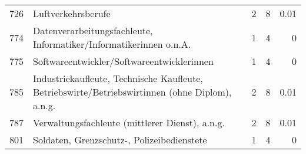 \begin{longtable}{lXrrr}
     726 &
     \multicolumn{1}{X}{ Luftverkehrsberufe   } &


       \num{2} &
       \num[round-mode=places,round-precision=2]{8} &
         \num[round-mode=places,round-precision=2]{0,01} \\

     774 &
     \multicolumn{1}{X}{ Datenverarbeitungsfachleute, Informatiker/Informatikerinnen o.n.A.   } &


       \num{1} &
       \num[round-mode=places,round-precision=2]{4} &
         \num[round-mode=places,round-precision=2]{0} \\

     775 &
     \multicolumn{1}{X}{ Softwareentwickler/Softwareentwicklerinnen   } &


       \num{1} &
       \num[round-mode=places,round-precision=2]{4} &
         \num[round-mode=places,round-precision=2]{0} \\

     785 &
     \multicolumn{1}{X}{ Industriekaufleute, Technische Kaufleute, Betriebswirte/Betriebswirtinnen (ohne Diplom), a.n.g.   } &


       \num{2} &
       \num[round-mode=places,round-precision=2]{8} &
         \num[round-mode=places,round-precision=2]{0,01} \\

     787 &
     \multicolumn{1}{X}{ Verwaltungsfachleute (mittlerer Dienst), a.n.g.   } &


       \num{2} &
       \num[round-mode=places,round-precision=2]{8} &
         \num[round-mode=places,round-precision=2]{0,01} \\

     801 &
     \multicolumn{1}{X}{ Soldaten, Grenzschutz-, Polizeibedienstete   } &


       \num{1} &
       \num[round-mode=places,round-precision=2]{4} &
         \num[round-mode=places,round-precision=2]{0} \\


\end{longtable}
